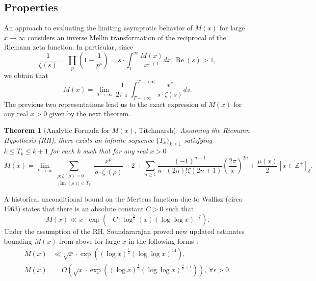 \documentclass[11pt,reqno,a4letter]{article}
\numberwithin{figure}{section}
\numberwithin{table}{section}
\newcommand{\Iverson}[1]{\ensuremath{\left[#1\right]_{\delta}}}
\theoremstyle{plain}
\newtheorem{theorem}{Theorem}
\numberwithin{theorem}{section}
\theoremstyle{definition}
\renewcommand{\Re}{\operatorname{Re}}
\renewcommand{\Im}{\operatorname{Im}}
\begin{document}
\subsection{Properties} 
\label{subSection_Intro_Mx_properties} 

An approach to evaluating the limiting asymptotic 
behavior of $M(x)$ for large $x \rightarrow \infty$ considers an 
inverse Mellin transformation of the reciprocal of the Riemann zeta function. 
In particular, since 
\[
\frac{1}{\zeta(s)} = \prod_{p} \left(1 - \frac{1}{p^s}\right) = 
     s \cdot \int_1^{\infty} \frac{M(x)}{x^{s+1}} dx, \Re(s) > 1, 
\]
we obtain that 
\[
M(x) = \lim_{T \rightarrow \infty}\ \frac{1}{2\pi\imath} \int_{T-\imath\infty}^{T+\imath\infty} 
     \frac{x^s}{s \cdot \zeta(s)} ds. 
\] 
The previous two representations lead us to the 
exact expression of $M(x)$ for any real $x > 0$ 
given by the next theorem. 
\nocite{TITCHMARSH} 

\begin{theorem}[Analytic Formula for $M(x)$, Titchmarsh] 
\label{theorem_MxMellinTransformInvFormula} 
Assuming the Riemann Hypothesis (RH), there exists an infinite sequence 
$\{T_k\}_{k \geq 1}$ satisfying $k \leq T_k \leq k+1$ for each $k$ 
such that for any real $x > 0$ 
\[
M(x) = \lim_{k \rightarrow \infty} 
     \sum_{\substack{\rho: \zeta(\rho) = 0 \\ |\Im(\rho)| < T_k}} 
     \frac{x^{\rho}}{\rho \cdot \zeta^{\prime}(\rho)} - 2 + 
     \sum_{n \geq 1} \frac{(-1)^{n-1}}{n \cdot (2n)! \zeta(2n+1)} 
     \left(\frac{2\pi}{x}\right)^{2n} + 
     \frac{\mu(x)}{2} \Iverson{x \in \mathbb{Z}^{+}}. 
\] 
\end{theorem} 

A historical unconditional bound on the Mertens function due to Walfisz (circa 1963) 
states that there is an absolute constant $C > 0$ such that 
$$M(x) \ll x \cdot \exp\left(-C \cdot \log^{\frac{3}{5}}(x) 
  (\log\log x)^{-\frac{3}{5}}\right).$$ 
Under the assumption of the RH, Soundararajan proved new updated estimates 
bounding $M(x)$ from above for large $x$ in the following forms \cite{SOUND-MERTENS-ANNALS}: 
\begin{align*} 
M(x) & \ll \sqrt{x} \cdot \exp\left((\log x)^{\frac{1}{2}} (\log\log x)^{14}\right), \\ 
M(x) & = O\left(\sqrt{x} \cdot \exp\left( 
     (\log x)^{\frac{1}{2}} (\log\log x)^{\frac{5}{2}+\epsilon}\right)\right),\ 
     \forall \epsilon > 0. 
\end{align*} 
\end{document}
